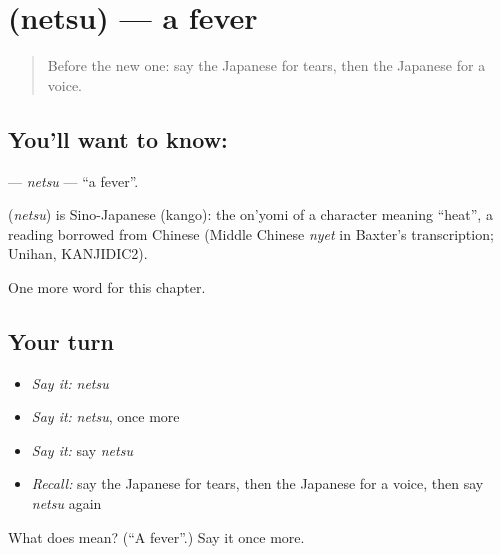 \section[\texorpdfstring{\ja{ねつ} (netsu)}{ねつ (netsu)}]{ (netsu) — a fever}

\label{lesson:JA-C22-netsu}



\begin{quote}
Before the new one: say the Japanese for tears, then the Japanese for a voice.
\end{quote}

\subsection*{You'll want to know: }
\textbf{} — \emph{netsu} — \textquotedblleft{}a fever\textquotedblright{}.

\begin{cousinweb}
\textbf{} (\emph{netsu}) is Sino-Japanese (kango): the on'yomi of a character meaning \textquotedblleft{}heat\textquotedblright{}, a reading borrowed from Chinese (Middle Chinese \emph{nyet} in Baxter's transcription; Unihan, KANJIDIC2).
\end{cousinweb}

\begin{grammarlens}[title={What you've built}]
One more word for this chapter.
\end{grammarlens}

\subsection*{Your turn}
\begin{itemize}
\raggedright
  \item \emph{Say it:} \emph{netsu}
  \item \emph{Say it:} \emph{netsu}, once more
  \item \emph{Say it:} say \emph{netsu}
  \item \emph{Recall:} say the Japanese for tears, then the Japanese for a voice, then say \emph{netsu} again
\end{itemize}

\begin{tcolorbox}[breakable,colback=teal!4,colframe=teal!35!black,title={Before you move on}]
What does  mean? (\textquotedblleft{}A fever\textquotedblright{}.) Say it once more.
\end{tcolorbox}
